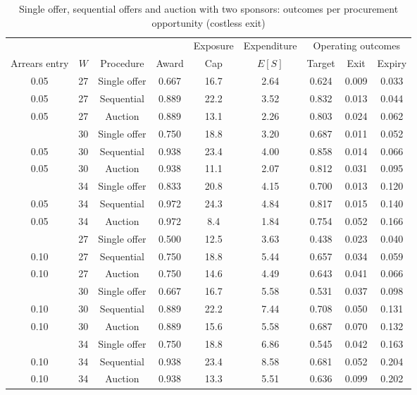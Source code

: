 \begin{table}[htbp]\centering\small
\caption{Single offer, sequential offers and auction with two sponsors: outcomes per procurement opportunity (costless exit)}\label{tab:c4compact}
\begin{tabular}{ccccccccc}\toprule
 & & & & Exposure & Expenditure & \multicolumn{3}{c}{Operating outcomes}\\\cmidrule(l){7-9}
Arrears entry & $W$ & Procedure & Award & Cap & $E[S]$ & Target & Exit & Expiry\\\midrule
0.05 & 27 & Single offer & 0.667 & 16.7 & 2.64 & 0.624 & 0.009 & 0.033\\
0.05 & 27 & Sequential & 0.889 & 22.2 & 3.52 & 0.832 & 0.013 & 0.044\\
0.05 & 27 & Auction & 0.889 & 13.1 & 2.26 & 0.803 & 0.024 & 0.062\\
\addlinespace
0.05 & 30 & Single offer & 0.750 & 18.8 & 3.20 & 0.687 & 0.011 & 0.052\\
0.05 & 30 & Sequential & 0.938 & 23.4 & 4.00 & 0.858 & 0.014 & 0.066\\
0.05 & 30 & Auction & 0.938 & 11.1 & 2.07 & 0.812 & 0.031 & 0.095\\
\addlinespace
0.05 & 34 & Single offer & 0.833 & 20.8 & 4.15 & 0.700 & 0.013 & 0.120\\
0.05 & 34 & Sequential & 0.972 & 24.3 & 4.84 & 0.817 & 0.015 & 0.140\\
0.05 & 34 & Auction & 0.972 & 8.4 & 1.84 & 0.754 & 0.052 & 0.166\\
\addlinespace
0.10 & 27 & Single offer & 0.500 & 12.5 & 3.63 & 0.438 & 0.023 & 0.040\\
0.10 & 27 & Sequential & 0.750 & 18.8 & 5.44 & 0.657 & 0.034 & 0.059\\
0.10 & 27 & Auction & 0.750 & 14.6 & 4.49 & 0.643 & 0.041 & 0.066\\
\addlinespace
0.10 & 30 & Single offer & 0.667 & 16.7 & 5.58 & 0.531 & 0.037 & 0.098\\
0.10 & 30 & Sequential & 0.889 & 22.2 & 7.44 & 0.708 & 0.050 & 0.131\\
0.10 & 30 & Auction & 0.889 & 15.6 & 5.58 & 0.687 & 0.070 & 0.132\\
\addlinespace
0.10 & 34 & Single offer & 0.750 & 18.8 & 6.86 & 0.545 & 0.042 & 0.163\\
0.10 & 34 & Sequential & 0.938 & 23.4 & 8.58 & 0.681 & 0.052 & 0.204\\
0.10 & 34 & Auction & 0.938 & 13.3 & 5.51 & 0.636 & 0.099 & 0.202\\

\end{tabular}
\end{table}
